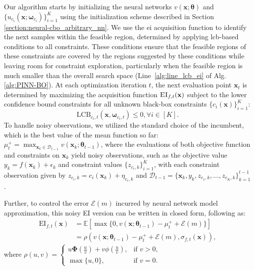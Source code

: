Our algorithm starts by initializing the neural networks $v(\mathbf{x}; \boldsymbol{\theta})$ and $\{u_{c_i}(\mathbf{x}; \boldsymbol{\omega}_{c_i})\}_{i=1}^K$ using the initialization scheme described in Section \ref{section:neural-cbo_arbitrary_nn}. We use the \ac{ei} acquisition function to identify the next samples within the feasible region, determined by applying \ac{lcb}-based conditions to all constraints. These conditions ensure that the feasible regions of these constraints are covered by the regions suggested by these conditions while leaving room for constraint exploration, particularly when the feasible region is much smaller than the overall search space  (Line~\ref{alg:line_lcb_ei} of Alg. \ref{alg:PINN-BO}). At each optimization iteration $t$, the next evaluation point $\mathbf{x}_t$ is determined by maximizing the acquisition function $\textsc{EI}_{f,t}(\mathbf{x})$ subject to the lower confidence bound constraints for all unknown black-box constraints $\{c_i(\mathbf{x})\}_{i=1}^K$:
\[
\text{LCB}_{c_i,t}(\mathbf{x}, \boldsymbol{\omega}_{c_i,t}) \le 0, \forall i \in [K].
\]
To handle noisy observations, we utilized the standard choice of the incumbent, which is
the best value of the mean function so far:
$\mu^+_t = \max_{\mathbf{x}_k \in \mathcal{D}_{t-1}} v(\mathbf{x}_k; \boldsymbol{\theta}_{t-1})$, where  
the evaluations of both objective function and constraints on $\mathbf{x}_k$ yield noisy observations, such as the objective value $y_k = f(\mathbf{x}_k) + \epsilon_k$ and constraint values $\{z_{c_i,k}\}_{i=1}^K$, with each constraint observation given by $z_{c_i,k} = c_i(\mathbf{x}_k) + \eta_{c_i,k}$ and $\mathcal{D}_{t-1} = \{\mathbf{x}_k, y_k, z_{c_1,k}, \dots, z_{{c_K}, k}\}_{k=1}^{t-1}$. 


Further, to control the error $\mathcal{E}(m)$ incurred by neural network model approximation, this noisy EI version can be written in closed form, following \citet{tran2022regret} as: 
\begin{align*}
    \text{EI}_{f,t}(\mathbf{x}) &= \mathbb{E}[\max \{0, v(\mathbf{x}; \boldsymbol{\theta}_{t-1}) - \mu^+_t + \mathcal{E}(m)\}]
    \\
    &= \rho (v(\mathbf{x}; \boldsymbol{\theta}_{t-1})- \mu^+_t + \mathcal{E}(m), \sigma_{f,t}(\mathbf{x})), 
\end{align*}
where $
  \rho(u,v) =
    \begin{cases}
      u \boldsymbol{\Phi}(\frac{u}{v}) + v \phi(\frac{u}{v}), & \text{if } v>0,
      \\
      \max \{u, 0\}, & \text{if } v=0.
    \end{cases}       
$
 

